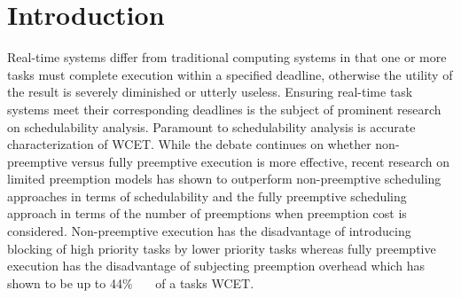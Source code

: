 \vspace{-10pt}
\section{Introduction}\label{sec:introduction}

Real-time systems differ from traditional computing systems in that one or more tasks must complete execution within a specified deadline, otherwise the utility of the result is severely diminished or utterly useless.  Ensuring real-time task systems meet their corresponding deadlines is the subject of prominent research on schedulability analysis.  Paramount to schedulability analysis is accurate characterization of WCET.  While the debate continues on whether non-preemptive versus fully preemptive execution is more effective, recent research on limited preemption models has shown to outperform non-preemptive scheduling approaches in terms of schedulability and the fully preemptive scheduling approach in terms of the number of preemptions when preemption cost is considered.  Non-preemptive execution has the disadvantage of introducing blocking of high priority tasks by lower priority tasks whereas fully preemptive execution has the disadvantage of subjecting preemption overhead which has shown to be up to 44\%~\cite{pellizzoni:07}~\cite{pellizzoni:08}~\cite{pellizzoni:11} of a tasks WCET.

